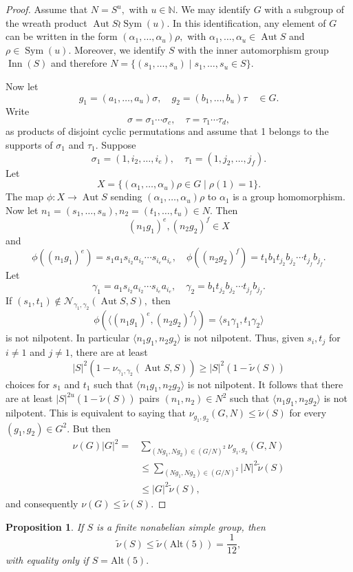 \documentclass{amsart}
\DeclareMathOperator{\perm}{Sym}
\DeclareMathOperator{\aut}{Aut}
\DeclareMathOperator{\inn}{Inn}
\newcommand{\alt}{\mathrm{Alt}}
\newtheorem{prop}[thm]{Proposition} \newtheorem{rem}[thm]{Remark}
\numberwithin{equation}{section}
\begin{document}
\begin{proof}
Assume that $N=S^u,$ with $u\in \mathbb N.$ 	We may identify $G$ with a subgroup of the wreath product $\aut S\wr \perm(u).$  In this identification, any element of $G$ can be written in the form $(\alpha_1,\dots,\alpha_u)\rho,$ with $\alpha_1,\dots,\alpha_u \in \aut S$ and $\rho \in \perm(u).$ 
Moreover, we identify $S$ with the inner automorphism group $\inn(S)$ and therefore
$N=\{(s_1,\dots,s_u)\mid s_1,\dots,s_u \in S\}.$

Now let $$g_1=(a_1,\dots,a_u)\sigma,\quad g_2=(b_1,\dots,b_u)\tau \quad \in G.$$
Write $$\sigma=\sigma_1\cdots \sigma_c, \quad  \tau=\tau_1\cdots \tau_d,$$ as products of disjoint cyclic permutations and assume that 1 belongs to the supports of $\sigma_1$ and $\tau_1.$ Suppose
$$\sigma_1=(1,i_2,\dots,i_e), \quad \tau_1=(1,j_2,\dots,j_f).$$
Let $$X=\{(\alpha_1,\dots,\alpha_u)\rho \in G \mid \rho(1)=1\}.$$ The map $\phi\colon X\to \aut S$ sending $(\alpha_1,\dots,\alpha_u)\rho$ to $\alpha_1$ is a group homomorphism. Now let $n_1=(s_1,\dots,s_u), n_2=(t_1,\dots,t_u) \in N$. Then
$$(n_1g_1)^e, (n_2g_2)^f \in X$$ and
$$\phi((n_1g_1)^e)=s_1a_1s_{i_2}a_{i_2}\cdots s_{i_e}a_{i_e},\quad
\phi((n_2g_2)^f)=t_1b_1t_{j_2}b_{j_2}\cdots t_{j_f}b_{j_f}.
$$
Let
$$\gamma_1=a_{1}s_{i_2}a_{i_2}\cdots s_{i_e}a_{i_e},\quad \gamma_2=b_{1}t_{j_2}b_{j_2}\cdots t_{j_f}b_{j_f}.$$
If $(s_1,t_1)\notin  \mathcal N_{\gamma_1,\gamma_2}(\aut S,S),$ then
	$$\phi(\langle (n_1g_1)^{e}, (n_2g_2)^f\rangle)=
	\langle s_1\gamma_1,t_1\gamma_2\rangle$$ is not nilpotent. In particular $\langle n_1g_1, n_2g_2\rangle$ is not nilpotent. Thus, given $s_i, t_j$ for $i\neq 1$ and $j\neq 1$, there are at least $$|S|^2(1-\nu_{\gamma_1,\gamma_2}(\aut S, S))\geq |S|^2(1-\tilde\nu(S))$$ choices for 
	$s_1$ and $t_1$ such that $\langle n_1g_1, n_2g_2\rangle$ is not nilpotent. It follows that there
	are at least $|S|^{2u}(1-\tilde \nu(S))$ pairs $(n_1,n_2)\in N^2$ such that $\langle n_1g_1,n_2g_2\rangle$ is not nilpotent. This is equivalent to saying that $\nu_{g_1,g_2}(G,N)\leq \tilde \nu(S)$ for every $(g_1,g_2) \in G^2.$ But then
	$$\begin{aligned}\nu(G)|G|^2=&\sum_{(Ng_1,Ng_2)\in  (G/N)^2}\nu_{g_1,g_2}(G,N)\\&\leq \sum_{(Ng_1,Ng_2)\in (G/N)^2}|N|^2\tilde\nu(S)\\&\leq |G|^2\tilde\nu(S),
	\end{aligned}$$
	and consequently $\nu(G)\leq \tilde \nu(S).$
\end{proof}
\begin{prop}\label{simple}
	If $S$ is a finite nonabelian simple group, then 
	$$\tilde \nu(S)\leq \tilde \nu(\alt(5))=\frac{1}{12},$$ with equality only if $S=\alt(5).$
\end{prop}
\end{document}
